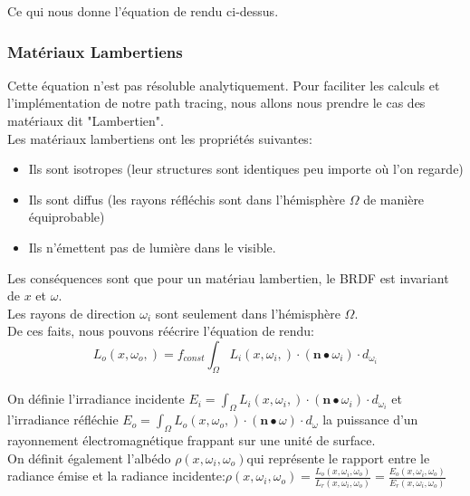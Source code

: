 \documentclass{article}
\begin{document}
    Ce qui nous donne l'équation de rendu ci-dessus.\\
    
    
    
    \subsubsection{Matériaux Lambertiens}
    Cette équation n'est pas résoluble analytiquement. Pour faciliter les calculs et l'implémentation de notre path tracing, nous allons nous prendre le cas des matériaux dit "Lambertien".\\
    
    Les matériaux lambertiens ont les propriétés suivantes:
    \begin{itemize}
  		\item[$\_$] Ils sont isotropes (leur structures sont identiques peu importe où l'on regarde)
  		\item[$\_$] Ils sont diffus (les rayons réfléchis sont dans l'hémisphère $\Omega$ de manière équiprobable)
  		\item[$\_$] Ils n'émettent pas de lumière dans le visible.
	\end{itemize}
	Les conséquences sont que pour un matériau lambertien, le BRDF est invariant de $x$ et $\omega$.\\
	Les rayons de direction $\omega_i$ sont seulement dans l'hémisphère $\Omega$.\\
	
	De ces faits, nous pouvons réécrire l'équation de rendu:
	 $$L_{o}\left(x, \omega_o,\right) = f_{const}\int_{\Omega}L_{i}\left(x, \omega_i,\right)\cdot \left(\textbf{n}\bullet\omega_{i}\right)\cdot d_{\omega_i}$$\\
	 
	 On définie l'irradiance incidente $E_i=\int_{\Omega}L_{i}\left(x, \omega_i,\right)\cdot \left(\textbf{n}\bullet\omega_{i}\right)\cdot d_{\omega_i}$ et l'irradiance réfléchie $E_o=\int_{\Omega}L_{o}\left(x, \omega_o,\right)\cdot \left(\textbf{n}\bullet\omega\right)\cdot d_{\omega}$ la puissance d'un rayonnement électromagnétique frappant sur une unité de surface.\\
	 
	 On définit également l'albédo $\rho\left( x, \omega_i, \omega_o\right)$qui représente le rapport entre le radiance émise et la radiance incidente:$\rho\left( x, \omega_i, \omega_o\right) =\frac{L_o\left( x, \omega_i, \omega_o\right)}{L_r\left( x, \omega_i, \omega_o\right)} = \frac{E_o\left( x, \omega_i, \omega_o\right)}{E_r\left( x, \omega_i, \omega_o\right)}$
	 
\end{document}
